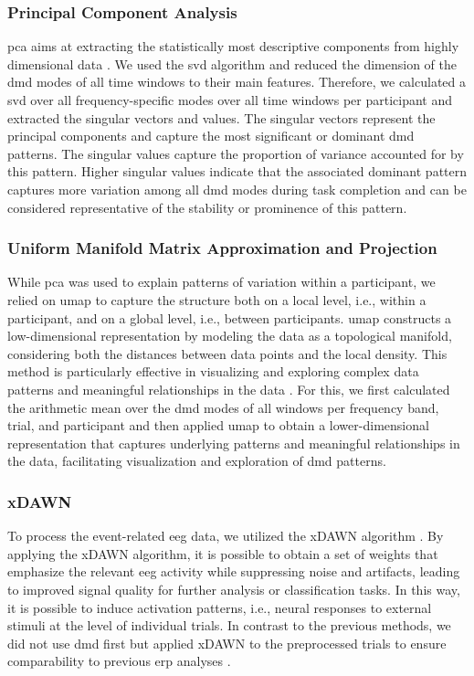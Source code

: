 \subsubsection{Principal Component Analysis}
\Gls{pca} aims at extracting the statistically most descriptive components from highly dimensional data \cite{BruntonKutz2019}. We used the \gls{svd} algorithm and reduced the dimension of the \gls{dmd} modes of all time windows to their main features. Therefore, we calculated a \gls{svd} over all frequency-specific modes over all time windows per participant and extracted the singular vectors and values. The singular vectors represent the principal components and capture the most significant or dominant \gls{dmd} patterns. The singular values capture the proportion of variance accounted for by this pattern. Higher singular values indicate that the associated dominant pattern captures more variation among all \gls{dmd} modes during task completion and can be considered representative of the stability or prominence of this pattern.

\subsubsection{Uniform Manifold Matrix Approximation and Projection}
While \gls{pca} was used to explain patterns of variation within a participant, we relied on \gls{umap} to capture the structure both on a local level, i.e., within a participant, and on a global level, i.e., between participants. \Gls{umap} constructs a low-dimensional representation by modeling the data as a topological manifold, considering both the distances between data points and the local density. This method is particularly effective in visualizing and exploring complex data patterns and meaningful relationships in the data \cite{Mcinnes2018}. For this, we first calculated the arithmetic mean over the \gls{dmd} modes of all windows per frequency band, trial, and participant and then applied \gls{umap} to obtain a lower-dimensional representation that captures underlying patterns and meaningful relationships in the data, facilitating visualization and exploration of \gls{dmd} patterns.

\subsubsection{xDAWN}
To process the event-related \gls{eeg} data, we utilized the xDAWN algorithm \cite{Rivet2009}. By applying the xDAWN algorithm, it is possible to obtain a set of weights that emphasize the relevant \gls{eeg} activity while suppressing noise and artifacts, leading to improved signal quality for further analysis or classification tasks. In this way, it is possible to induce activation patterns, i.e., neural responses to external stimuli at the level of individual trials. In contrast to the previous methods, we did not use \gls{dmd} first but applied xDAWN to the preprocessed trials to ensure comparability to previous \gls{erp} analyses \cite{Reuter2019}.

